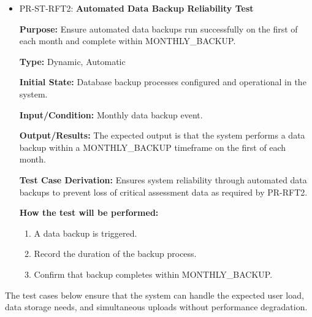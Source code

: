 \documentclass[12pt, titlepage]{article}
\begin{document}
\begin{itemize}
  \item PR-ST-RFT2: \textbf{Automated Data Backup Reliability Test}
    \begin{mdframed}[linewidth=0.5mm]
      \textbf{Purpose:} Ensure automated data backups run successfully on the first of each month and complete within MONTHLY\_BACKUP. \par
      \textbf{Type:} Dynamic, Automatic \par
      \textbf{Initial State:} Database backup processes configured and operational in the system. \par
      \textbf{Input/Condition:} Monthly data backup event. \par
      \textbf{Output/Results:} The expected output is that the system performs a data backup within a MONTHLY\_BACKUP timeframe on the first of each month. \par
      \textbf{Test Case Derivation:} Ensures system reliability through automated data backups to prevent loss of critical assessment data as required by PR-RFT2. \par
      \textbf{How the test will be performed:}
      \begin{enumerate}[noitemsep]
        \item A data backup is triggered.
        \item Record the duration of the backup process.
        \item Confirm that backup completes within MONTHLY\_BACKUP.
      \end{enumerate}
  \end{mdframed}
\end{itemize}

\vspace{1em}
\hspace{2em}The test cases below ensure that the system can handle the expected user load, data storage needs, and simultaneous uploads without performance degradation.
\end{document}
